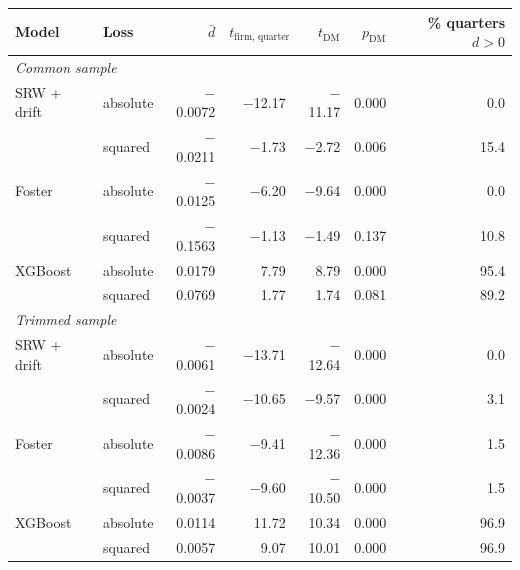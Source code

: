 \begin{tabular}{llrrrrr}
\toprule
Model & Loss & $\bar d$ & $t_{\text{firm, quarter}}$ & $t_{\text{DM}}$ & $p_{\text{DM}}$ & \% quarters $d>0$ \\
\midrule
\multicolumn{7}{l}{\emph{Common sample}} \\
SRW + drift & absolute & $-$0.0072 & $-$12.17 & $-$11.17 & 0.000 & 0.0 \\
 & squared & $-$0.0211 & $-$1.73 & $-$2.72 & 0.006 & 15.4 \\
Foster & absolute & $-$0.0125 & $-$6.20 & $-$9.64 & 0.000 & 0.0 \\
 & squared & $-$0.1563 & $-$1.13 & $-$1.49 & 0.137 & 10.8 \\
XGBoost & absolute & 0.0179 & 7.79 & 8.79 & 0.000 & 95.4 \\
 & squared & 0.0769 & 1.77 & 1.74 & 0.081 & 89.2 \\
\midrule
\multicolumn{7}{l}{\emph{Trimmed sample}} \\
SRW + drift & absolute & $-$0.0061 & $-$13.71 & $-$12.64 & 0.000 & 0.0 \\
 & squared & $-$0.0024 & $-$10.65 & $-$9.57 & 0.000 & 3.1 \\
Foster & absolute & $-$0.0086 & $-$9.41 & $-$12.36 & 0.000 & 1.5 \\
 & squared & $-$0.0037 & $-$9.60 & $-$10.50 & 0.000 & 1.5 \\
XGBoost & absolute & 0.0114 & 11.72 & 10.34 & 0.000 & 96.9 \\
 & squared & 0.0057 & 9.07 & 10.01 & 0.000 & 96.9 \\
\bottomrule
\end{tabular}
